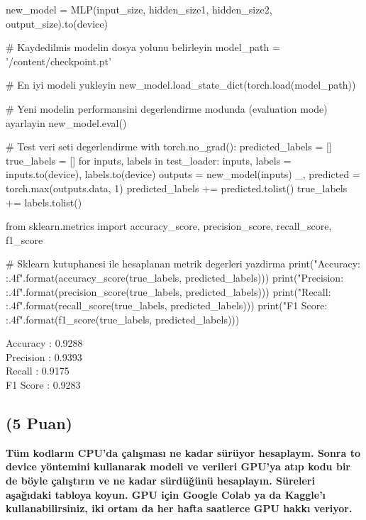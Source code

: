 \documentclass[11pt]{article}
\begin{document}
\vspace{.3in}

\begin{python}
new_model = MLP(input_size, hidden_size1, hidden_size2, output_size).to(device)

# Kaydedilmis modelin dosya yolunu belirleyin
model_path = '/content/checkpoint.pt'

# En iyi modeli yukleyin
new_model.load_state_dict(torch.load(model_path))

# Yeni modelin performansini degerlendirme modunda (evaluation mode) ayarlayin
new_model.eval()

# Test veri seti degerlendirme
with torch.no_grad():
    predicted_labels = []
    true_labels = []
    for inputs, labels in test_loader:
        inputs, labels = inputs.to(device), labels.to(device)
        outputs = new_model(inputs)
        _, predicted = torch.max(outputs.data, 1)
        predicted_labels += predicted.tolist()
        true_labels += labels.tolist()
        
from sklearn.metrics import accuracy_score, precision_score, recall_score, f1_score

# Sklearn kutuphanesi ile hesaplanan metrik degerleri yazdirma
print("Accuracy: {:.4f}".format(accuracy_score(true_labels, predicted_labels)))
print("Precision: {:.4f}".format(precision_score(true_labels, predicted_labels)))
print("Recall: {:.4f}".format(recall_score(true_labels, predicted_labels)))
print("F1 Score: {:.4f}".format(f1_score(true_labels, predicted_labels)))

\end{python}

\vspace{.3in}

\begin{flushleft}
Accuracy    : 0.9288\\
Precision   : 0.9393\\
Recall      : 0.9175\\
F1 Score    : 0.9283
\end{flushleft}

\vspace{.6in}
\subsection{(5 Puan)} \textbf{Tüm kodların CPU'da çalışması ne kadar sürüyor hesaplayın. Sonra to device yöntemini kullanarak modeli ve verileri GPU'ya atıp kodu bir de böyle çalıştırın ve ne kadar sürdüğünü hesaplayın. Süreleri aşağıdaki tabloya koyun. GPU için Google Colab ya da Kaggle'ı kullanabilirsiniz, iki ortam da her hafta saatlerce GPU hakkı veriyor.}
\end{document}
